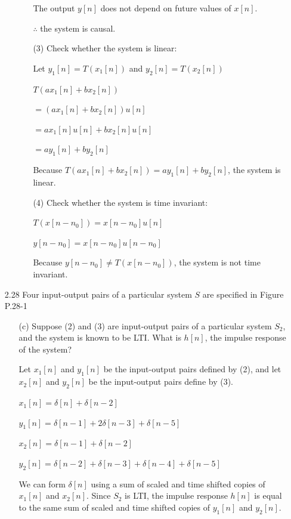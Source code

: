 \documentclass[fleqn]{article}
\begin{document}
\begin{enumerate}[nolistsep]
\begin{enumerate}[nolistsep]
\begin{enumerate}[nolistsep]
					The output $y[n]$ does not depend on future values of $x[n]$.
					
					$\therefore$ the system is causal.
					
					\item[(3)] Check whether the system is linear:
					
					Let $y_1[n] = T(x_1[n])$ and $y_2[n] = T(x_2[n])$
					
					$T(ax_1[n] + bx_2[n])$
					
					$ = (ax_1[n] + bx_2[n])u[n]$
					
					$ = ax_1[n]u[n] + bx_2[n]u[n]$
					
					$ = ay_1[n] + by_2[n]$
					
					Because $T(ax_1[n] + bx_2[n]) = ay_1[n] + by_2[n]$, the system is linear.
					
					\item[(4)] Check whether the system is time invariant:
					
					$T(x[n-n_0]) = x[n-n_0]u[n]$
					
					$y[n-n_0] = x[n-n_0]u[n-n_0]$
					
					Because $y[n-n_0] \neq T(x[n-n_0])$, the system is not time invariant.
				\end{enumerate}
			
			
			
		\end{enumerate}
		
		\item[2.28] Four input-output pairs of a particular system $S$ are specified in Figure P.28-1
		
			\begin{enumerate}
				\item[(c)] Suppose (2) and (3) are input-output pairs of a particular system $S_2$, and the system is known to be LTI. What is $h[n]$, the impulse response of the system?
				
				Let $x_1[n]$ and $y_1[n]$ be the input-output pairs defined by (2), and let $x_2[n]$ and $y_2[n]$ be the input-output pairs define by (3).
				
			$x_1[n] = \delta[n] + \delta[n-2]$
			
			$y_1[n] = \delta[n-1] + 2\delta[n-3] + \delta[n-5]$
			
			$x_2[n] = \delta[n-1] + \delta[n-2]$
			
			$y_2[n] = \delta[n-2] + \delta[n-3] + \delta[n-4] + \delta[n-5]$
			
			We can form $\delta[n]$ using a sum of scaled and time shifted copies of $x_1[n]$ and $x_2[n]$. Since $S_2$ is LTI, the impulse response $h[n]$ is equal to the same sum of scaled and time shifted copies of $y_1[n]$ and $y_2[n]$.
			

\end{enumerate}
\end{enumerate}
\end{document}
